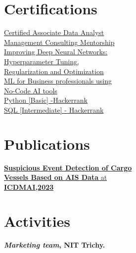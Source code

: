 \documentclass[]{deedy-resume-openfont}
\begin{document}
\begin{minipage}[t]{0.33\textwidth}
\section{Certifications}
\textbullet{} \href{https://www.datacamp.com/certificate/DAA0017955149813}{Certified Associate Data Analyst}\\
\textbullet{}\href{https://api.growthschool.io/certificate/818d42d3-2ad2-4fc3-b36c-73b74b176cbd}{Management Consulting Mentorship}\\
\textbullet{}\href{https://www.coursera.org/account/accomplishments/verify/H9MCR2DN3S3W}{Improving Deep Neural Networks:\\ Hyperparameter Tuning{,} \\Regularization and Optimization}\\
\textbullet{}\href{https://www.coursera.org/account/accomplishments/verify/H9MCR2DN3S3W}{ML for Business professionals using \\No-Code AI tools}\\
\textbullet{}\href{https://www.hackerrank.com/certificates/54c9338aea7a}{Python [Basic] -Hackerrank}\\
\textbullet{}\href{https://www.hackerrank.com/certificates/4eb61b3b4e85}{SQL [Intermediate] - Hackerrank}
\sectionsep

\section{Publications}
\href{https://link.springer.com/chapter/10.1007/978-981-99-1414-2_8}{
\textbullet{}\textbf{Suspicious Event Detection of Cargo\\ Vessels
Based on AIS Data} at \\ \textbf{ICDMAI,2023}}
\sectionsep

\section{Activities}
\textbullet{}\textbf{\textit{Marketing team}, NIT Trichy.}
\sectionsep
%
%



\end{minipage}%
\end{document}
